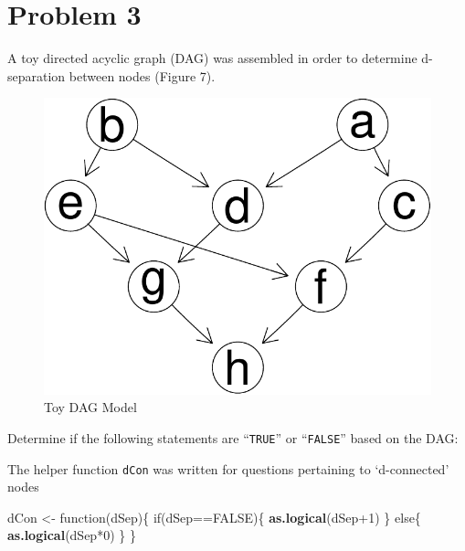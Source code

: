 \documentclass[]{article}
\newenvironment{Shaded}{\begin{snugshade}}{\end{snugshade}}
\newcommand{\KeywordTok}[1]{\textcolor[rgb]{0.13,0.29,0.53}{\textbf{{#1}}}}
\newcommand{\DecValTok}[1]{\textcolor[rgb]{0.00,0.00,0.81}{{#1}}}
\newcommand{\StringTok}[1]{\textcolor[rgb]{0.31,0.60,0.02}{{#1}}}
\newcommand{\OtherTok}[1]{\textcolor[rgb]{0.56,0.35,0.01}{{#1}}}
\newcommand{\NormalTok}[1]{{#1}}
\begin{document}
\section{Problem 3}\label{problem-3}

A toy directed acyclic graph (DAG) was assembled in order to determine
d-separation between nodes (Figure 7).

\begin{figure}

{\centering \includegraphics{sta546_hw3_files/figure-latex/unnamed-chunk-11-1} 

}

\caption{Toy DAG Model}\label{fig:unnamed-chunk-11}
\end{figure}

Determine if the following statements are ``\texttt{TRUE}'' or
``\texttt{FALSE}'' based on the DAG:

The helper function \texttt{dCon} was written for questions pertaining
to `d-connected' nodes

\begin{Shaded}
\begin{Highlighting}[]
\NormalTok{dCon <-}\StringTok{ }\NormalTok{function(dSep)\{}
        \NormalTok{if(dSep==}\OtherTok{FALSE}\NormalTok{)\{}
                \KeywordTok{as.logical}\NormalTok{(dSep}\DecValTok{+1}\NormalTok{)}
        \NormalTok{\}}
        \NormalTok{else\{}
                \KeywordTok{as.logical}\NormalTok{(dSep*}\DecValTok{0}\NormalTok{)}
        \NormalTok{\}}
\NormalTok{\}}
\end{Highlighting}
\end{Shaded}
\end{document}
